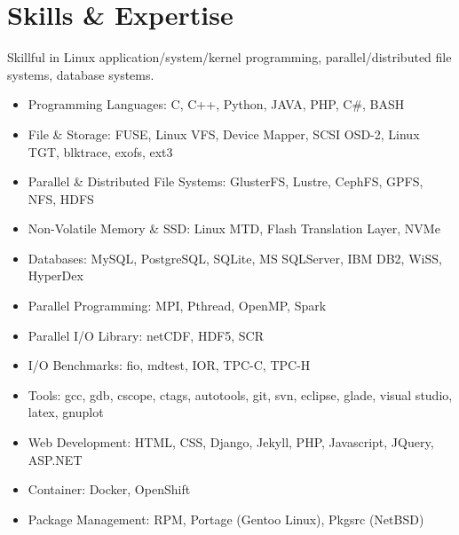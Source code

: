 \section{Skills \& Expertise}
Skillful in Linux application/system/kernel programming, parallel/distributed
file systems, database systems.
\begin{itemize}
\item {Programming Languages}: C, C++, Python, JAVA, PHP, C\#, BASH
\item {File \& Storage}: FUSE, Linux VFS, Device Mapper, SCSI OSD-2, Linux TGT, blktrace, exofs, ext3
\item {Parallel \& Distributed File Systems}: GlusterFS, Lustre, CephFS, GPFS, NFS, HDFS
\item {Non-Volatile Memory \& SSD}: Linux MTD, Flash Translation Layer, NVMe
\item {Databases}: MySQL, PostgreSQL, SQLite, MS SQLServer, IBM DB2, WiSS, HyperDex
\item {Parallel Programming}: MPI, Pthread, OpenMP, Spark
\item {Parallel I/O Library}: netCDF, HDF5, SCR
\item {I/O Benchmarks}: fio, mdtest, IOR, TPC-C, TPC-H
\item {Tools}: gcc, gdb, cscope, ctags, autotools, git, svn, eclipse, glade, visual studio, latex, gnuplot
\item {Web Development}: HTML, CSS, Django, Jekyll, PHP, Javascript, JQuery, ASP.NET
\item {Container}: Docker, OpenShift
\item {Package Management}: RPM, Portage (Gentoo Linux), Pkgsrc (NetBSD)
\end{itemize}

